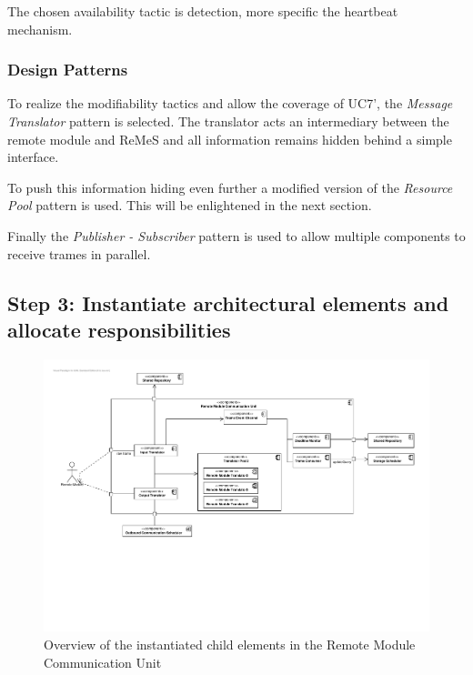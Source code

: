 \npar The chosen availability tactic is detection, more specific the heartbeat
mechanism.

\subsubsection{Design Patterns}
\label{add:it2/patterns}

\npar To realize the modifiability tactics and allow the coverage of UC7', the
\emph{Message Translator} pattern is selected. The translator acts an
intermediary between the remote module and ReMeS and all information remains
hidden behind a simple interface. 

\npar To push this information hiding even further a modified version of the
\emph{Resource Pool} pattern is used. This will be enlightened in the next
section.

\npar Finally the \emph{Publisher - Subscriber} pattern is used to allow
multiple components to receive trames in parallel. 

\subsection{Step 3: Instantiate architectural elements and allocate responsibilities}
\label{add:it2/elements}

\begin{figure}[H]
	\begin{centering}
		\includegraphics[width=\textwidth]{figs/add-it2-elements.pdf}
		\caption{Overview of the instantiated child elements in the Remote Module
		Communication Unit}
		\label{fig:it2/elements}
	\end{centering}
\end{figure}

